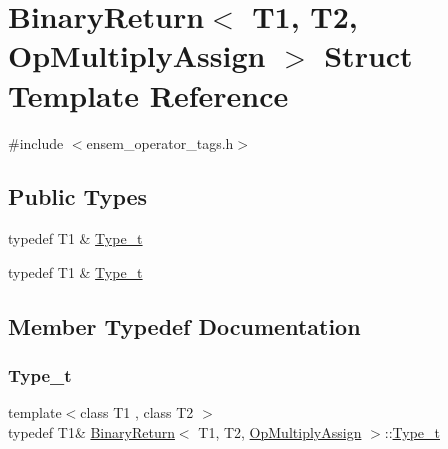 \hypertarget{structBinaryReturn_3_01T1_00_01T2_00_01OpMultiplyAssign_01_4}{}\section{Binary\+Return$<$ T1, T2, Op\+Multiply\+Assign $>$ Struct Template Reference}
\label{structBinaryReturn_3_01T1_00_01T2_00_01OpMultiplyAssign_01_4}


{\ttfamily \#include $<$ensem\+\_\+operator\+\_\+tags.\+h$>$}

\subsection*{Public Types}
\begin{DoxyCompactItemize}
\item 
typedef T1 \& \mbox{\hyperlink{structBinaryReturn_3_01T1_00_01T2_00_01OpMultiplyAssign_01_4_a87fa61c2114e9aa9f0550dc271144d42}{Type\+\_\+t}}
\item 
typedef T1 \& \mbox{\hyperlink{structBinaryReturn_3_01T1_00_01T2_00_01OpMultiplyAssign_01_4_a87fa61c2114e9aa9f0550dc271144d42}{Type\+\_\+t}}
\end{DoxyCompactItemize}


\subsection{Member Typedef Documentation}
\mbox{\label{structBinaryReturn_3_01T1_00_01T2_00_01OpMultiplyAssign_01_4_a87fa61c2114e9aa9f0550dc271144d42}} 
\subsubsection{\texorpdfstring{Type\_t}{Type\_t}\hspace{0.1cm}{\footnotesize\ttfamily [1/2]}}
{\footnotesize\ttfamily template$<$class T1 , class T2 $>$ \\
typedef T1\& \mbox{\hyperlink{structBinaryReturn}{Binary\+Return}}$<$ T1, T2, \mbox{\hyperlink{structOpMultiplyAssign}{Op\+Multiply\+Assign}} $>$\+::\mbox{\hyperlink{structBinaryReturn_3_01T1_00_01T2_00_01OpMultiplyAssign_01_4_a87fa61c2114e9aa9f0550dc271144d42}{Type\+\_\+t}}}

